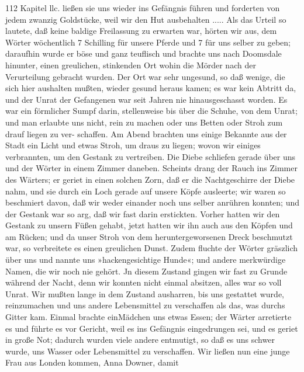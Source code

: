 112 Kapitel llc.
ließen sie uns wieder ins Gefängnis führen und forderten von
jedem zwanzig Goldstücke, weil wir den Hut ausbehalten .....
Als das Urteil so lautete, daß keine baldige Freilassung
zu erwarten war, hörten wir aus, dem Wörter wöchentlich
7 Schilling für unsere Pferde und 7 für uns selber zu geben;
daraufhin wurde er böse und ganz teuflisch und brachte uns nach
Doomsdale hinunter, einen greulichen, stinkenden Ort wohin die
Mörder nach der Verurteilung gebracht wurden. Der Ort war
sehr ungesund, so daß wenige, die sich hier aushalten mußten,
wieder gesund heraus kamen; es war kein Abtritt da, und der
Unrat der Gefangenen war seit Jahren nie hinausgeschasst worden.
Es war ein förmlicher Sumpf darin, stellenweise bis über die
Schuhe, von dem Unrat; und man erlaubte uns nicht, rein zu
machen oder uns Betten oder Stroh zum drauf liegen zu ver-
schaffen. Am Abend brachten uns einige Bekannte aus der Stadt
ein Licht und etwas Stroh, um draus zu liegen; wovon wir einiges
verbrannten, um den Gestank zu vertreiben. Die Diebe schliefen
gerade über uns und der Wörter in einem Zimmer daneben.
Scheints drang der Rauch ins Zimmer des Wärters; er geriet
in einen solchen Zorn, daß er die Nachtgeschirre der Diebe nahm,
und sie durch ein Loch gerade auf unsere Köpfe ausleerte; wir
waren so beschmiert davon, daß wir weder einander noch uns selber
anrühren konnten; und der Gestank war so arg, daß wir fast
darin erstickten. Vorher hatten wir den Gestank zu unsern Füßen
gehabt, jetzt hatten wir ihn auch aus den Köpfen und am Rücken;
und da unser Stroh von dem heruntergeworsenen Dreck beschmutzt
war, so verbreitete es einen greulichen Dunst. Zudem fluchte der
Wörter gräszlich über uns und nannte uns »hackengesichtige Hunde«;
und andere merkwürdige Namen, die wir noch nie gehört. Jn
diesem Zustand gingen wir fast zu Grunde während der Nacht,
denn wir konnten nicht einmal absitzen, alles war so voll Unrat.
Wir mußten lange in dem Zustand ausharren, bis uns gestattet
wurde, reinzumachen und uns andere Lebensmittel zu verschaffen als
das, was durchs Gitter kam. Einmal brachte einMädchen uns etwas
Essen; der Wärter arretierte es und führte es vor Gericht, weil
es ins Gefängnis eingedrungen sei, und es geriet in große Not;
dadurch wurden viele andere entmutigt, so daß es uns schwer
wurde, uns Wasser oder Lebensmittel zu verschaffen. Wir ließen
nun eine junge Frau aus Londen kommen, Anna Downer, damit


